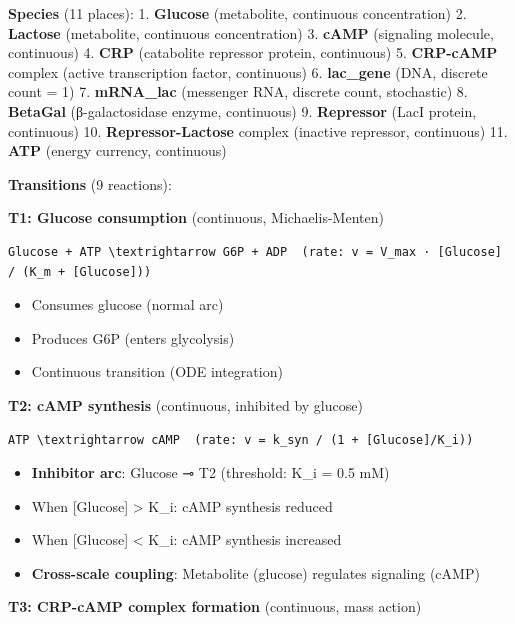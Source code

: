 \textbf{Species} (11 places): 1. \textbf{Glucose} (metabolite,
continuous concentration) 2. \textbf{Lactose} (metabolite, continuous
concentration) 3. \textbf{cAMP} (signaling molecule, continuous) 4.
\textbf{CRP} (catabolite repressor protein, continuous) 5.
\textbf{CRP-cAMP} complex (active transcription factor, continuous) 6.
\textbf{lac\_gene} (DNA, discrete count = 1) 7. \textbf{mRNA\_lac}
(messenger RNA, discrete count, stochastic) 8. \textbf{BetaGal}
(β-galactosidase enzyme, continuous) 9. \textbf{Repressor} (LacI
protein, continuous) 10. \textbf{Repressor-Lactose} complex (inactive
repressor, continuous) 11. \textbf{ATP} (energy currency, continuous)

\textbf{Transitions} (9 reactions):

\textbf{T1: Glucose consumption} (continuous, Michaelis-Menten)

\begin{lstlisting}
Glucose + ATP \textrightarrow G6P + ADP  (rate: v = V_max · [Glucose] / (K_m + [Glucose]))
\end{lstlisting}

\begin{itemize}
\tightlist
\item
  Consumes glucose (normal arc)
\item
  Produces G6P (enters glycolysis)
\item
  Continuous transition (ODE integration)
\end{itemize}

\textbf{T2: cAMP synthesis} (continuous, inhibited by glucose)

\begin{lstlisting}
ATP \textrightarrow cAMP  (rate: v = k_syn / (1 + [Glucose]/K_i))
\end{lstlisting}

\begin{itemize}
\tightlist
\item
  \textbf{Inhibitor arc}: Glucose ⊸ T2 (threshold: K\_i = 0.5 mM)
\item
  When {[}Glucose{]} \textgreater{} K\_i: cAMP synthesis reduced
\item
  When {[}Glucose{]} \textless{} K\_i: cAMP synthesis increased
\item
  \textbf{Cross-scale coupling}: Metabolite (glucose) regulates
  signaling (cAMP)
\end{itemize}

\textbf{T3: CRP-cAMP complex formation} (continuous, mass action)

